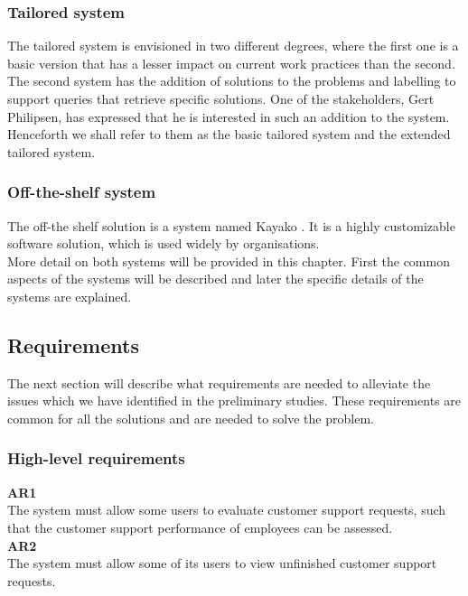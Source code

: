 \subsubsection{Tailored system}
The tailored system is envisioned in two different degrees, where the first one is a basic version that has a lesser impact on current work practices than the second. \\
The second system has the addition of solutions to the problems and labelling to support queries that retrieve specific solutions. One of the stakeholders, Gert Philipsen, has expressed that he is interested in such an addition to the system\cite{gert003}.\\
Henceforth we shall refer to them as the basic tailored system and the extended tailored system.

\subsubsection{Off-the-shelf system}
The off-the shelf solution is a system named Kayako \cite{website005}. It is a highly customizable software solution, which is used widely by organisations.\cite{website006} \\
More detail on both systems will be provided in this chapter. First the common aspects of the systems will be described and later the specific details of the systems are explained.

\subsection{Requirements}
The next section will describe what requirements are needed to alleviate the issues which we have identified in the preliminary studies. These requirements are common for all the solutions and are needed to solve the problem.

\subsubsection{High-level requirements}
\textbf{AR1} \\
The system must allow some users to evaluate customer support requests, such that the customer support performance of employees can be assessed. \\

\textbf{AR2} \\
The system must allow some of its users to view unfinished customer support requests. \\

